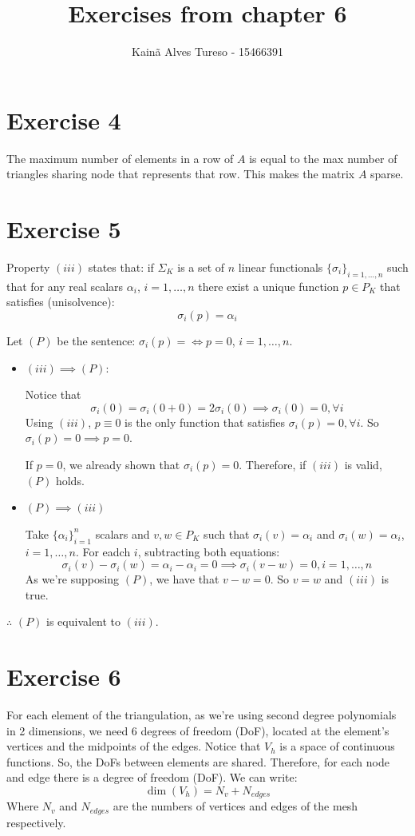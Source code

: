 \documentclass{article}
\title{Exercises from chapter 6}
\author{Kainã Alves Tureso - 15466391}
\begin{document}
    \section*{Exercise 4}
    The maximum number of elements in a row of $A$ is equal to the max number of triangles sharing node that represents that row. This makes the matrix $A$ sparse.

    \section*{Exercise 5}
    Property $(iii)$ states that: if $\Sigma_K$ is a set of $n$ linear functionals $\{\sigma_i\}_{i=1, \dots, n}$ such that for any real scalars $\alpha_i$, $i = 1, \dots, n$ there exist a unique function $p \in P_K$ that satisfies (unisolvence):
    \[
        \sigma_i(p) = \alpha_i
    \]

    Let $(P)$ be the sentence: $\sigma_i(p) = \iff p=0$, $i = 1, \dots, n$.
    \begin{itemize}
        \item $(iii) \implies (P)$:
        
        Notice that 
        \[
            \sigma_i(0) = \sigma_i(0+0) = 2 \sigma_i(0) \implies \sigma_i(0) = 0, \forall i
        \]
        Using $(iii)$, $p \equiv 0$ is the only function that satisfies $\sigma_i(p) =0, \forall i$. So $\sigma_i(p) = 0 \implies p =0$.

        If $p=0$, we already shown that $\sigma_i(p) = 0$. Therefore, if $(iii)$ is valid, $(P)$ holds.



        \item $(P) \implies (iii)$
        
        Take $\{\alpha_i\}^n_{i=1}$ scalars and $v,w \in P_K$ such that $\sigma_i(v) = \alpha_i$ and $\sigma_i(w) = \alpha_i$, $i = 1, \dots, n$. For eadch $i$, subtracting both equations:
        \[
            \sigma_i(v) - \sigma_i(w) = \alpha_i - \alpha_i = 0 \implies \sigma_i(v-w) = 0, i = 1, \dots, n
        \]
        As we're supposing $(P)$, we have that $v-w = 0$. So $v = w$ and $(iii)$ is true.
    \end{itemize}

    $\therefore$ $(P)$ is equivalent to $(iii)$.

    \section*{Exercise 6}
    For each element of the triangulation, as we're using second degree polynomials in 2 dimensions, we need 6 degrees of freedom (DoF), located at the element's vertices and the midpoints of the edges. Notice that $V_h$ is a space of continuous functions. So, the DoFs between elements are shared. Therefore, for each node and edge there is a degree of freedom (DoF). We can write:
    \[
        \dim(V_h) = N_v + N_{edges}
    \] 
    Where $N_v$ and $N_{edges}$ are the numbers of vertices and edges of the mesh respectively.
    
\end{document}
